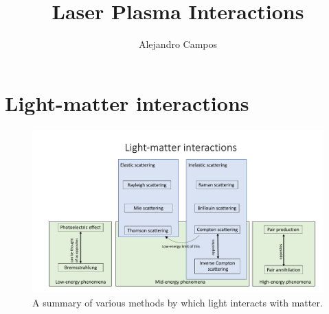 \documentclass[a4paper,11pt]{report}
\title{Laser Plasma Interactions}
\author{Alejandro Campos}
\begin{document}
\maketitle
\tableofcontents

\appendix

\chapter{Light-matter interactions}
\begin{figure}[ht]
    \centering
    \includegraphics[width=15cm]{../../images/light_matter.pdf}
    \caption{A summary of various methods by which light interacts with matter.}
    \label{fig:light_matter}
\end{figure}



\end{document}
